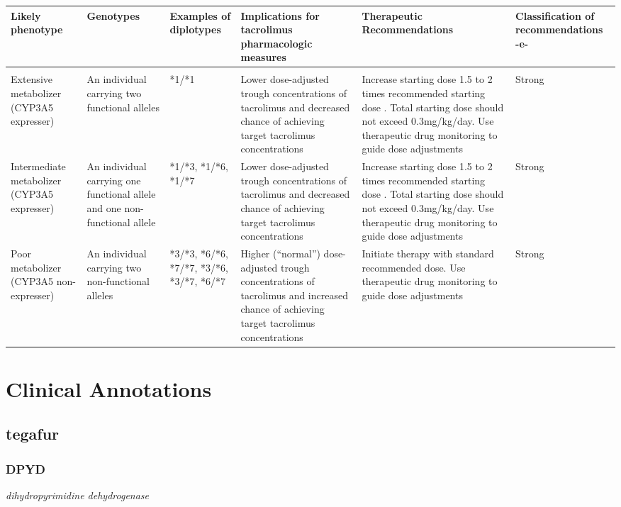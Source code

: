 \documentclass{report}
\begin{document}
      \begin{tabularx}{\textwidth}{ XXXXXX }
      \textbf{ Likely phenotype  }&\textbf{ Genotypes }&\textbf{ Examples of diplotypes  }&\textbf{ Implications for tacrolimus pharmacologic measures }&\textbf{ Therapeutic Recommendations  }&\textbf{ Classification of recommendations -e- } \\ \hline \\  Extensive metabolizer (CYP3A5 expresser) & An individual carrying two functional alleles & *1/*1 & Lower dose-adjusted trough concentrations of tacrolimus and decreased chance of achieving target tacrolimus concentrations & Increase starting dose 1.5 to 2 times recommended starting dose . Total starting dose should not exceed 0.3mg/kg/day. Use therapeutic drug monitoring to guide dose adjustments & Strong  \\  Intermediate metabolizer (CYP3A5 expresser) & An individual carrying one functional allele and one non-functional allele & *1/*3, *1/*6, *1/*7& Lower dose-adjusted trough concentrations of tacrolimus and decreased chance of achieving target tacrolimus concentrations & Increase starting dose 1.5 to 2 times recommended starting dose . Total starting dose should not exceed 0.3mg/kg/day. Use therapeutic drug monitoring to guide dose adjustments & Strong  \\  Poor metabolizer (CYP3A5 non-expresser) & An individual carrying two non-functional alleles & *3/*3, *6/*6, *7/*7, *3/*6, *3/*7, *6/*7& Higher (“normal”) dose-adjusted trough concentrations of tacrolimus and increased chance of achieving target tacrolimus concentrations & Initiate therapy with standard recommended dose. Use therapeutic drug monitoring to guide dose adjustments & Strong  \\ 
      \end{tabularx}
      
      \newpage
      \normalsize







\newpage

\section{Clinical Annotations}

\subsection{ tegafur }\subsubsection{ DPYD }
\textit{ dihydropyrimidine dehydrogenase } \newline
\end{document}
